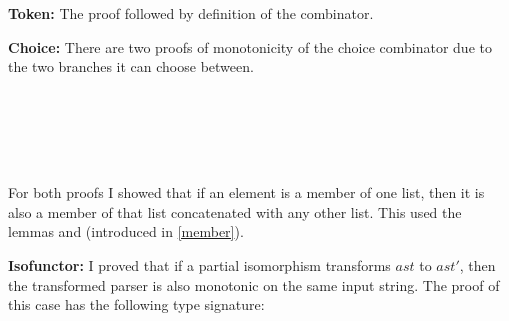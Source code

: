 \documentclass[12pt,a4paper,twoside,openright]{report}
\newcommand{\F}{\AgdaFunction}
\begin{document}
{\bf Token:} The proof followed by definition of the \F{token} combinator.

\begin{code}
\> \AgdaSymbol{:} \AgdaSymbol{(} \AgdaSymbol{:} \AgdaSymbol{)}     \AgdaFunction{[}  \AgdaFunction{]}   \<%
\end{code}

{\bf Choice:} There are two proofs of monotonicity of the choice combinator due to the two branches it can choose between.

\begin{code}
\> \AgdaSymbol{:} \>[20]               \<%
\\
\>[4]\<[20]%
\>[20]        \<%
\\
\\
\> \AgdaSymbol{:} \>[20]               \<%
\\
\>[0]\<[20]%
\>[20]        \<%
\end{code}

For both proofs I showed that if an element is a member of one list, then it is also a member of that list concatenated with any other list. This used the lemmas \F{$\in$-++$^l$} and \F{$\in$-++$^r$} (introduced in \autoref{member}).

{\bf Isofunctor:} 
I proved that if a partial isomorphism transforms {$ast$} to {$ast'$}, then the transformed parser is also monotonic on the same input string. The proof of this case has the following type signature:
\end{document}
